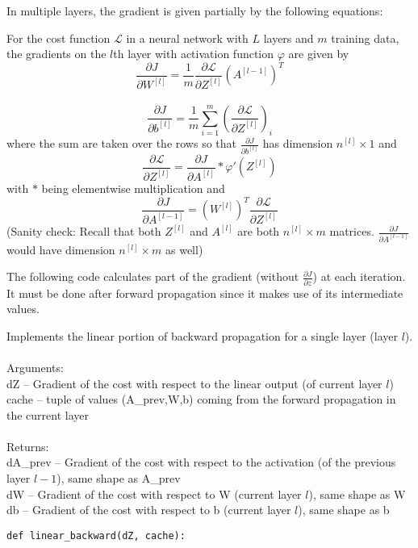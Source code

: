 \documentclass[a4paper]{article}
\begin{document}
\begin{enumerate}
In multiple layers, the gradient is given partially by the following equations: 

\begin{prp}{}{} For the cost function $\mathcal{L}$ in a neural network with $L$ layers and $m$ training data, the gradients on the $l$th layer with activation function $\varphi$ are given by $$\frac{\partial J}{\partial W^{[l]}}=\frac{1}{m}\frac{\partial\mathcal{L}}{\partial Z^{[l]}}\left(A^{[l-1]}\right)^T$$~$$\frac{\partial J}{\partial b^{[l]}}=\frac{1}{m}\sum_{i=1}^m\left(\frac{\partial\mathcal{L}}{\partial Z^{[l]}}\right)_i$$ where the sum are taken over the rows so that $\frac{\partial J}{\partial b^{[l]}}$ has dimension $n^{[l]}\times 1$ and $$\frac{\partial\mathcal{L}}{\partial Z^{[l]}}=\frac{\partial J}{\partial A^{[l]}}\ast\varphi'(Z^{[l]})$$ with $\ast$ being elementwise multiplication and $$\frac{\partial J}{\partial A^{[l-1]}}=(W^{[l]})^T\frac{\partial\mathcal{L}}{\partial Z^{[l]}}$$ (Sanity check: Recall that both $Z^{[l]}$ and $A^{[l]}$ are both $n^{[l]}\times m$ matrices. $\frac{\partial J}{\partial A^{[l-1]}}$ would have dimension $n^{[l]}\times m$ as well)
\end{prp}

The following code calculates part of the gradient (without $\frac{\partial J}{\partial z}$) at each iteration. It must be done after forward propagation since it makes use of its intermediate values. 

\begin{alg}{}{} Implements the linear portion of backward propagation for a single layer (layer $l$). \\~\\
Arguments: \\
dZ -- Gradient of the cost with respect to the linear output (of current layer $l$)\\
cache -- tuple of values (A\_prev,W,b) coming from the forward propagation in the current layer\\~\\
Returns: \\
dA\_prev -- Gradient of the cost with respect to the activation (of the previous layer $l-1$), same shape as A\_prev\\
dW -- Gradient of the cost with respect to W (current layer $l$), same shape as W\\
db -- Gradient of the cost with respect to b (current layer $l$), same shape as b\\
\begin{verbatim}
def linear_backward(dZ, cache):


\end{verbatim}
\end{alg}
\end{enumerate}
\end{document}
